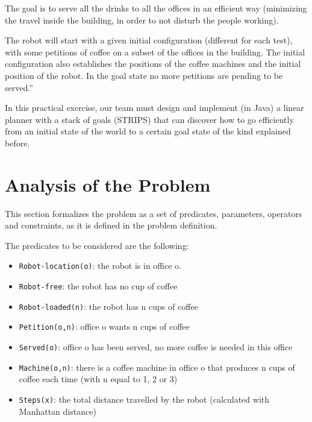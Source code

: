 \documentclass[12pt,a4paper,oneside]{article}
\numberwithin{equation}{section}
\numberwithin{equation}{section}
\theoremstyle{definition}
\begin{document}
The goal is to serve all the drinks to all the offices in an efficient way (minimizing the travel inside the building, in order to not disturb the people working).


The robot will start with a given initial configuration (different for each test), with some petitions of coffee on a subset of the offices in the building. The initial configuration also establishes the positions of the coffee machines and the initial position of the robot. In the goal state no more petitions are pending to be served.”


In this practical exercise, our team must design and implement (in Java) a linear planner with a stack of goals (STRIPS) that can discover how to go efficiently from an initial state of the world to a certain goal state of the kind explained before.


\newpage

\section{Analysis of the Problem} \label{Analysis of the Problem}

This section formalizes the problem as a set of predicates, parameters, operators and constraints, as it is defined in the problem definition\cite{problemdefinition}.


The predicates to be considered are the following:
\begin{itemize}
	\item \texttt{Robot-location(o)}: the robot is in office o.
	\item \texttt{Robot-free}: the robot has no cup of coffee
	\item \texttt{Robot-loaded(n)}: the robot has n cups of coffee
	\item \texttt{Petition(o,n)}: office o wants n cups of coffee
	\item \texttt{Served(o)}: office o has been served, no more coffee is needed in this office
	\item \texttt{Machine(o,n)}: there is a coffee machine in office o that produces n cups of coffee each time (with n equal to 1, 2 or 3)
	\item \texttt{Steps(x)}: the total distance travelled by the robot (calculated with Manhattan distance)
\end{itemize}
\end{document}
